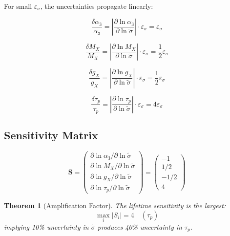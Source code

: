 \documentclass[11pt,letterpaper]{article}
\newtheorem{theorem}{Theorem}[section]
\newcommand{\st}{\tilde{\sigma}}
\newcommand{\eps}{\varepsilon}
\begin{document}
For small $\eps_\sigma$, the uncertainties propagate linearly:

\begin{equation}
\frac{\delta \alpha_3}{\alpha_3} = \left| \frac{\partial \ln \alpha_3}{\partial \ln \st} \right| \cdot \eps_\sigma = \eps_\sigma
\label{eq:delta-alpha3}
\end{equation}

\begin{equation}
\frac{\delta M_X}{M_X} = \left| \frac{\partial \ln M_X}{\partial \ln \st} \right| \cdot \eps_\sigma = \frac{1}{2} \eps_\sigma
\label{eq:delta-mx}
\end{equation}

\begin{equation}
\frac{\delta g_X}{g_X} = \left| \frac{\partial \ln g_X}{\partial \ln \st} \right| \cdot \eps_\sigma = \frac{1}{2} \eps_\sigma
\label{eq:delta-gx}
\end{equation}

\begin{equation}
\frac{\delta \tau_p}{\tau_p} = \left| \frac{\partial \ln \tau_p}{\partial \ln \st} \right| \cdot \eps_\sigma = 4 \eps_\sigma
\label{eq:delta-taup}
\end{equation}

\subsection{Sensitivity Matrix}
\label{subsec:sensitivity-matrix}

\begin{equation}
\mathbf{S} = \begin{pmatrix}
\partial \ln \alpha_3 / \partial \ln \st \\
\partial \ln M_X / \partial \ln \st \\
\partial \ln g_X / \partial \ln \st \\
\partial \ln \tau_p / \partial \ln \st
\end{pmatrix}
= \begin{pmatrix} -1 \\ 1/2 \\ -1/2 \\ 4 \end{pmatrix}
\label{eq:sensitivity-matrix}
\end{equation}

\begin{theorem}[Amplification Factor]
\label{thm:amplification}
The lifetime sensitivity is the largest:
\begin{equation}
\max_i |S_i| = 4 \quad (\tau_p)
\label{eq:max-sensitivity}
\end{equation}
implying 10\% uncertainty in $\st$ produces 40\% uncertainty in $\tau_p$.
\end{theorem}
\end{document}
